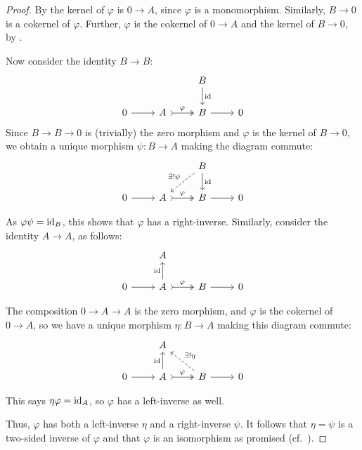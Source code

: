 \begin{proof}
  By  the kernel of $\varphi$ is $0 \to A$, since
  $\varphi$ is a monomorphism. Similarly, $B \to 0$ is a cokernel of
  $\varphi$. Further, $\varphi$ is the cokernel of $0 \to A$ and the
  kernel of $B \to 0$, by .

  Now consider the identity $B \to B$:
  \[\begin{tikzcd}
      & & B \arrow[d, "\id"] & \\
      0 \arrow[r] & A \arrow[r, "\varphi", tail, two heads] & B
      \arrow[r] & 0
    \end{tikzcd}\] Since $B \to B \to 0$ is (trivially) the zero
  morphism and $\varphi$ is the kernel of $B \to 0$, we obtain a
  unique morphism $\psi : B \to A$ making the diagram commute:
  \[\begin{tikzcd}
      & & B \arrow[d, "\id"] \arrow[dl, dashed, "\exists! \psi"'] & \\
      0 \arrow[r] & A \arrow[r, "\varphi", tail, two heads] & B
      \arrow[r] & 0
    \end{tikzcd}\]

  As $\varphi\psi = \operatorname{id}_B$, this shows that $\varphi$ has a
  right-inverse. Similarly, consider the identity $A \to A$, as
  follows:
  \[\begin{tikzcd}
      & A & & \\
      0 \arrow[r] & A \arrow[u, "\id"] \arrow[r, "\varphi", tail, two
      heads] & B \arrow[r] & 0
    \end{tikzcd}\]

  The composition $0 \to A \to A$ is the zero morphism, and $\varphi$
  is the cokernel of $0 \to A$, so we have a unique morphism
  $\eta : B \to A$ making this diagram commute:
  \[\begin{tikzcd}
      & A & & \\
      0 \arrow[r] & A \arrow[u, "\id"] \arrow[r, "\varphi", tail, two
      heads] & B \arrow[r] \arrow[ul, dashed, "\exists!  \eta"'] & 0
    \end{tikzcd}\]

  This says $\eta\varphi = \operatorname{id}_A$, so $\varphi$ has a left-inverse as
  well.

  Thus, $\varphi$ has both a left-inverse $\eta$ and a right-inverse
  $\psi$. It follows that $\eta = \psi$ is a two-sided inverse of
  $\varphi$ and that $\varphi$ is an isomorphism as promised (cf.\
  ).
\end{proof}
